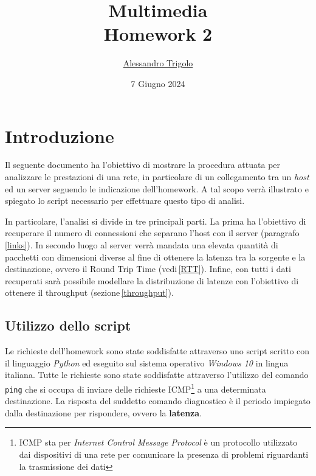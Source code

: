 \title{\vspace{160px} \textbf{\huge{Multimedia}} \\\vspace{17.5px} \LARGE{Homework 2}  \vspace{10px}}
\author{\href{https://github.com/imAlessas}{Alessandro Trigolo}}
\date{7 Giugno 2024}



\maketitle\newpage

\tableofcontents
\vspace{50px}
\listoffigures
\newpage


\section{Introduzione}

Il seguente documento ha l'obiettivo di mostrare la procedura attuata per analizzare le prestazioni di una rete, in particolare di un collegamento tra un \textsl{host} ed un server seguendo le indicazione dell'homework. A tal scopo verrà illustrato e spiegato lo script necessario per effettuare questo tipo di analisi. 

In particolare, l'analisi si divide in tre principali parti. La prima ha l'obiettivo di recuperare il numero di connessioni che separano l'host con il server (paragrafo\,\ref{links}). In secondo luogo al server verrà mandata una elevata quantità di pacchetti con dimensioni diverse al fine di ottenere la latenza tra la sorgente e la destinazione, ovvero il Round Trip Time (vedi\,\ref{RTT}). Infine, con tutti i dati recuperati sarà possibile modellare la distribuzione di latenze con l'obiettivo di ottenere il throughput (sezione\,\ref{throughput}).

\vspace{10px}\subsection{Utilizzo dello script}

Le richieste dell'homework sono state soddisfatte attraverso uno script scritto con il linguaggio \textsl{Python} ed eseguito sul sistema operativo \textsl{Windows 10} in lingua italiana. Tutte le richieste sono state soddisfatte attraverso l'utilizzo del comando \texttt{ping} che si occupa di inviare delle richieste ICMP\footnote{ICMP sta per \textsl{Internet Control Message Protocol} è un protocollo utilizzato dai dispositivi di una rete per comunicare la presenza di problemi riguardanti la trasmissione dei dati} a una determinata destinazione. La risposta del suddetto comando diagnostico è il periodo impiegato dalla destinazione per rispondere, ovvero la \textbf{latenza}.

